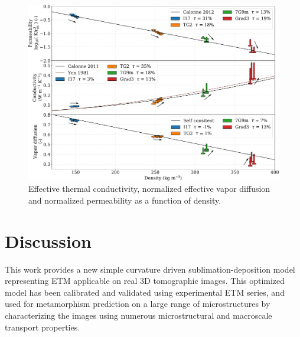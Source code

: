 \documentclass[draft,ms]{agujournal2019}
\begin{document}
\begin{figure}
    \centering
    \includegraphics[width=\linewidth]{Figures/tplot_all_arrows.pdf}
    \caption{Effective thermal conductivity, normalized effective vapor diffusion and normalized permeability as a function of density.}
    \label{fig:Tplot}
\end{figure}


\section{Discussion}
\label{sec:disc}

This work provides a new simple curvature driven sublimation-deposition model representing ETM applicable on real 3D tomographic images. This optimized model has been calibrated and validated using experimental ETM series, and used for metamorphism prediction on a large range of microstructures by characterizing the images using numerous microstructural and macroscale transport properties.

\end{document}
